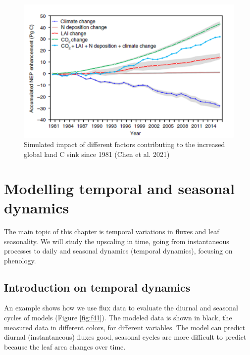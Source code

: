 \documentclass[
  12pt,
  oneside]{book}
\begin{document}
\begin{figure}

{\centering \includegraphics[width=0.8\linewidth]{figures/chap3/f335_chen2} 

}

\caption{Simulated impact of different factors contributing to the increased global land C sink since 1981 (Chen et al. 2021) }\label{fig:f335}
\end{figure}

\hypertarget{modelling-temporal-and-seasonal-dynamics}{%
\chapter{Modelling temporal and seasonal dynamics}\label{modelling-temporal-and-seasonal-dynamics}}


The main topic of this chapter is temporal variations in fluxes and leaf seasonality. We will study the upscaling in time, going from instantaneous processes to daily and seasonal dynamics (temporal dynamics), focusing on phenology.

\hypertarget{introduction-on-temporal-dynamics}{%
\section{Introduction on temporal dynamics}\label{introduction-on-temporal-dynamics}}

An example shows how we use flux data to evaluate the diurnal and seasonal cycles of models (Figure \ref{fig:f41}). The modeled data is shown in black, the measured data in different colors, for different variables. The model can predict diurnal (instantaneous) fluxes good, seasonal cycles are more difficult to predict because the leaf area changes over time.
\end{document}
